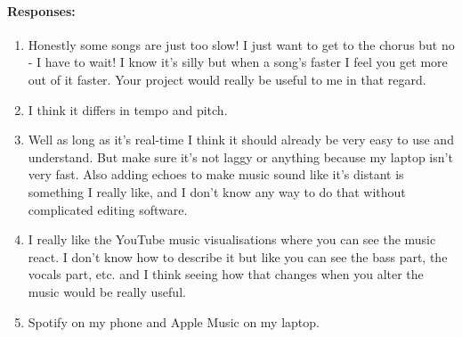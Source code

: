 {{\begin{minipage}{15cm}
			\paragraph{Responses:}
			\begin{enumerate}
				\item Honestly some songs are just too slow! I just want to get to the chorus but no - I have to wait! I know it's silly but when a song's faster I feel you get more out of it faster. Your project would really be useful to me in that regard.
				\item I think it differs in tempo and pitch.
				\item Well as long as it's real-time I think it should already be very easy to use and understand. But make sure it's not laggy or anything because my laptop isn't very fast. Also adding echoes to make music sound like it's distant is something I really like, and I don't know any way to do that without complicated editing software.
				\item I really like the YouTube music visualisations where you can see the music react. I don't know how to describe it but like you can see the bass part, the vocals part, etc. and I think seeing how that changes when you alter the music would be really useful.
				\item Spotify on my phone and Apple Music on my laptop.
			\end{enumerate}
			\bigskip \bigskip \bigskip
	\end{minipage}}
}